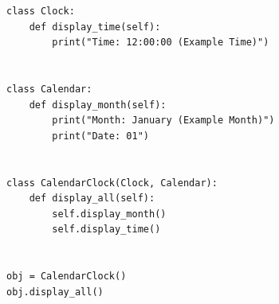 \begin{verbatim}
class Clock:
    def display_time(self):
        print("Time: 12:00:00 (Example Time)")


class Calendar:
    def display_month(self):
        print("Month: January (Example Month)")
        print("Date: 01")


class CalendarClock(Clock, Calendar):
    def display_all(self):
        self.display_month()
        self.display_time()


obj = CalendarClock()
obj.display_all()
\end{verbatim}